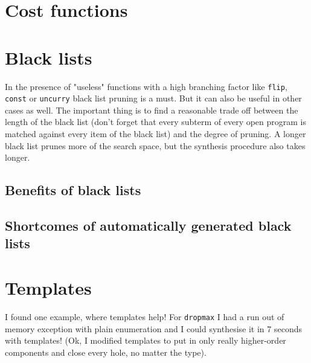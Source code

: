 \section{Cost functions}

\section{Black lists}

In the presence of "useless" functions with a high branching factor like \lstinline?flip?, \lstinline?const? or \lstinline?uncurry? black list pruning is a must. But it can also be useful in other cases as well. The important thing is to find a reasonable trade off between the length of the black list (don't forget that every subterm of every open program is matched against every item of the black list) and the degree of pruning. A longer black list prunes more of the search space, but the synthesis procedure also takes longer.

  \subsection{Benefits of black lists}
  \subsection{Shortcomes of automatically generated black lists}

\section{Templates}
I found one example, where templates help! For \lstinline?dropmax? I had a run out of memory exception with plain enumeration and I could synthesise it in 7 seconds with templates!
(Ok, I modified templates to put in only really higher-order components and close every hole, no matter the type).

